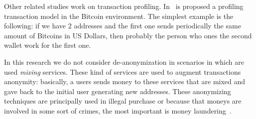 Other related studies work on transaction profiling. In~\cite{fullDiscl} is
proposed a profiling transaction model in the Bitcoin environment. The
simplest example is the following: if we have 2 addresses and the first one
sends periodically the same amount of Bitcoins in US Dollars, then probably
the person who ones the second wallet work for the first one.

In this research we do not consider de-anonymization in scenarios in which are
used \textit{mixing} services. These kind of services are used to augment
transactions anonymity: basically, a users sends money to these services that
are mixed and gave back to the initial user generating new addresses. These
anonymizing techniques are principally used in illegal purchase or because
that moneys are involved in some sort of crimes, the most important is money
laundering~\cite{laudering}.
